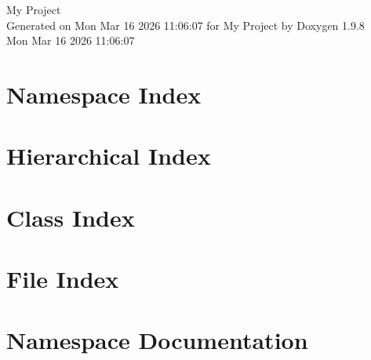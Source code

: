 \documentclass[twoside]{book}
\newcommand{\+}{\discretionary{\mbox{\scriptsize$\hookleftarrow$}}{}{}}
\newcommand{\clearemptydoublepage}{%
    \newpage{\pagestyle{empty}\cleardoublepage}%
  }
\begin{document}
  \raggedbottom
    \hypersetup{pageanchor=false,
                bookmarksnumbered=true,
                pdfencoding=unicode
               }
  \begin{titlepage}
  \vspace*{7cm}
  \begin{center}%
  {\Large My Project}\\
  \vspace*{1cm}
  {\large Generated on Mon Mar 16 2026 11\+:06\+:07 for My Project by Doxygen 1.9.8}\\
    \vspace*{0.5cm}
    {\small Mon Mar 16 2026 11:06:07}
  \end{center}
  \end{titlepage}
  \clearemptydoublepage
  \tableofcontents
  \clearemptydoublepage
  \hypersetup{pageanchor=true}
\chapter{Namespace Index}

\chapter{Hierarchical Index}

\chapter{Class Index}

\chapter{File Index}

\chapter{Namespace Documentation}

\end{document}
